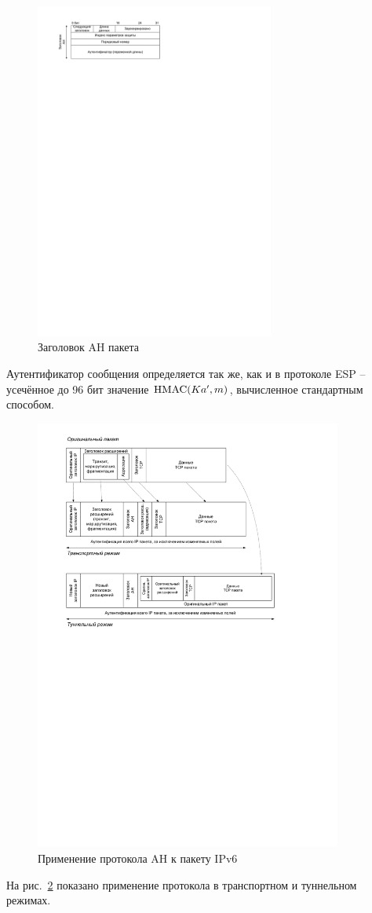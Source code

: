 \begin{figure}[!ht]
	\centering
	\includegraphics[width=0.7\textwidth]{pic/ipsec-ah}
	\caption{Заголовок AH пакета\label{fig:ipsec-ah}}
\end{figure}

Аутентификатор сообщения определяется так же, как и в протоколе ESP -- усечённое до 96 бит значение $\textrm{HMAC}(Ka', m)$, вычисленное стандартным способом.

\begin{figure}[!ht]
	\centering
	\includegraphics[width=0.9\textwidth]{pic/ipsec-ah-modes}
	\caption{Применение протокола AH к пакету IPv6\label{fig:ipsec-ah-modes}}
\end{figure}

На рис.~\ref{fig:ipsec-ah-modes} показано применение протокола в транспортном и туннельном режимах.
